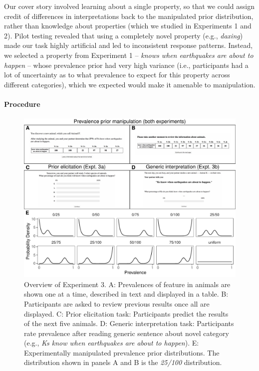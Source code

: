 \documentclass[floatsintext,man]{apa6}
\let\oldparagraph\paragraph
\renewcommand{\paragraph}[1]{\oldparagraph{#1}\mbox{}}
\newcommand{\mht}[1]{{\textcolor{Blue}{[mht: #1]}}}
\begin{document}
Our cover story involved learning about a single property, so that we could assign credit of differences in interpretations back to the manipulated prior distribution, rather than knowledge about properties (which we studied in Experiments 1 and 2). 
Pilot testing revealed that using a completely novel property (e.g., \emph{daxing}) made our task highly artificial and led to inconsistent response patterns. 
Instead, we selected a property from Experiment 1 --  \emph{knows when earthquakes are about to happen} -- whose prevalence prior had very high variance (i.e., participants had a lot of uncertainty as to what prevalence to expect for this property across different categories), which we expected would make it amenable to manipulation.

\hypertarget{procedure}{%
\paragraph{Procedure}\label{procedure}}
%
\begin{figure}
\centering
\includegraphics{figs/expt2-overview.pdf}
\caption{\label{fig:priorManipulationExpt}Overview of Experiment 3. A: Prevalences of feature in animals are shown one at a time, described in text and displayed in a table. B: Participants are asked to review previous results once all are displayed. C: Prior elicitation task: Participants predict the results of the next five animals. D: Generic interpretation task: Participants rate prevalence after reading generic sentence about novel category (e.g., \emph{Ks know when earthquakes are about to happen}). E: Experimentally manipulated prevalence prior distributions. The distribution shown in panels A and B is the \emph{25/100} distribution.}
\end{figure}
\end{document}
